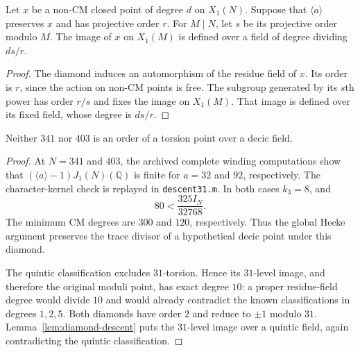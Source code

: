\begin{lemma}\label{lem:diamond-descent}
Let $x$ be a non-CM closed point of degree $d$ on $X_1(N)$.
Suppose that $\langle a\rangle$ preserves $x$ and has projective order $r$.
For $M\mid N$, let $s$ be its projective order modulo $M$.
The image of $x$ on $X_1(M)$ is defined over a field of degree dividing
$ds/r$.
\end{lemma}
\begin{proof}
The diamond induces an automorphism of the residue field of $x$.
Its order is $r$, since the action on non-CM points is free.
The subgroup generated by its $s$th power has order $r/s$ and fixes
the image on $X_1(M)$. That image is defined over its fixed field,
whose degree is $ds/r$.
\end{proof}

\begin{proposition}\label{prop:descent31}
Neither $341$ nor $403$ is an order of a torsion point over a decic field.
\end{proposition}
\begin{proof}
At $N=341$ and $403$, the archived complete winding computations
show that $(\langle a\rangle-1)J_1(N)(\mathbb Q)$ is finite for
$a=32$ and $92$, respectively. The character-kernel check is replayed
in \texttt{descent31.m}. In both cases $k_3=8$, and
\[
 80<\frac{325I_N}{32768}.
\]
The minimum CM degrees are $300$ and $120$, respectively.
Thus the global Hecke argument preserves the trace divisor of a
hypothetical decic point under this diamond.

The quintic classification excludes $31$-torsion. Hence its
$31$-level image, and therefore the original moduli point, has exact
degree $10$: a proper residue-field degree would divide $10$ and
would already contradict the known classifications in degrees $1,2,5$.
Both diamonds have order $2$ and reduce to $\pm1$ modulo $31$.
Lemma~\ref{lem:diamond-descent} puts the $31$-level image over a
quintic field, again contradicting the quintic classification.
\end{proof}
